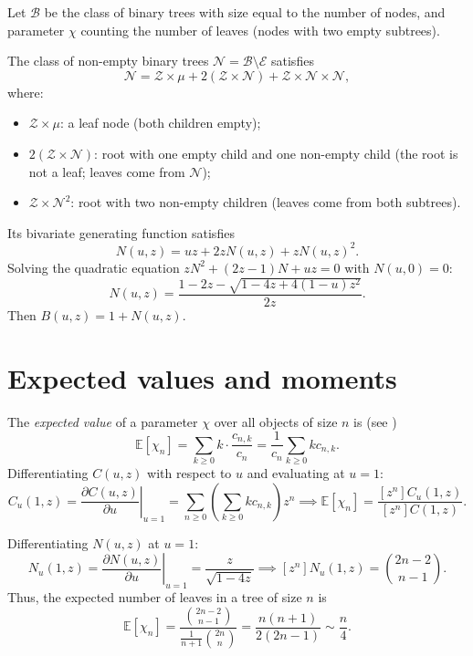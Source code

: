 \begin{example}
    Let \(\mathcal{B}\) be the class of binary trees with size equal to the number of nodes, and parameter \(\chi\) counting the number of leaves (nodes with two empty subtrees).
    
    The class of non-empty binary trees \(\mathcal{N} = \mathcal{B} \setminus \mathcal{E}\) satisfies
    \[
        \mathcal{N} = \mathcal{Z} \times \mu + 2(\mathcal{Z} \times \mathcal{N}) + \mathcal{Z} \times \mathcal{N} \times \mathcal{N},
    \]
    where:
    \begin{itemize}
        \item \(\mathcal{Z} \times \mu\): a leaf node (both children empty);
        \item \(2(\mathcal{Z} \times \mathcal{N})\): root with one empty child and one non-empty child (the root is not a leaf; leaves come from \(\mathcal{N}\));
        \item \(\mathcal{Z} \times \mathcal{N}^2\): root with two non-empty children (leaves come from both subtrees).
    \end{itemize}
    Its bivariate generating function satisfies
    \[
        N(u, z) = uz + 2z N(u, z) + z N(u, z)^2.
    \]
    Solving the quadratic equation \(z N^2 + (2z-1)N + uz = 0\) with \(N(u, 0) = 0\):
    \[
        N(u, z) = \frac{1 - 2z - \sqrt{1 - 4z + 4(1-u)z^2}}{2z}.
    \]
    Then \(B(u, z) = 1 + N(u, z)\).
\end{example}

\section*{Expected values and moments}

The \emph{expected value} of a parameter \(\chi\) over all objects of size \(n\) is (see \cite[Chapter 7]{MelczerNotes})
\[
    \mathbb{E}[\chi_n] = \sum_{k \ge 0} k \cdot \frac{c_{n,k}}{c_n} = \frac{1}{c_n} \sum_{k \ge 0} k c_{n,k}.
\]
Differentiating \(C(u, z)\) with respect to \(u\) and evaluating at \(u=1\):
\[
    C_u(1, z) = \left. \frac{\partial C(u, z)}{\partial u} \right|_{u=1} = \sum_{n \ge 0} \left( \sum_{k \ge 0} k c_{n,k} \right) z^n \implies \mathbb{E}[\chi_n] = \frac{[z^n] C_u(1, z)}{[z^n] C(1, z)}.
\]

\begin{example}
    Differentiating \(N(u, z)\) at \(u=1\):
    \[
        N_u(1, z) = \left. \frac{\partial N(u, z)}{\partial u}\right|_{u=1} = \frac{z}{\sqrt{1-4z}} \implies [z^n] N_u(1, z) = \binom{2n-2}{n-1}.
    \]
    Thus, the expected number of leaves in a tree of size \(n\) is
    \[
        \mathbb{E}[\chi_n] = \frac{\binom{2n-2}{n-1}}{\frac{1}{n+1}\binom{2n}{n}} = \frac{n(n+1)}{2(2n-1)} \sim \frac{n}{4}.
    \]
\end{example}